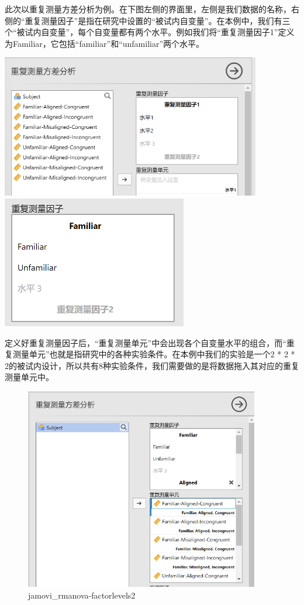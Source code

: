 \documentclass[
]{book}
\begin{document}
此次以重复测量方差分析为例。在下图左侧的界面里，左侧是我们数据的名称，右侧的``重复测量因子''是指在研究中设置的``被试内自变量''。在本例中，我们有三个``被试内自变量''，每个自变量都有两个水平。例如我们将``重复测量因子1''定义为Familiar，它包括``familiar''和``unfamiliar''两个水平。

\includegraphics{img/jamovi/rmanova-factor.png}\\
\includegraphics{img/jamovi/rmanova-factorlevels.png}

定义好重复测量因子后，``重复测量单元''中会出现各个自变量水平的组合，而``重复测量单元''也就是指研究中的各种实验条件。在本例中我们的实验是一个2 * 2 * 2的被试内设计，所以共有8种实验条件，我们需要做的是将数据拖入其对应的重复测量单元中。

\begin{figure}
\centering
\includegraphics{img/jamovi/rmanova-factorlevels2.png}
\caption{jamovi\_rmanova-factorlevels2}
\end{figure}
\end{document}
